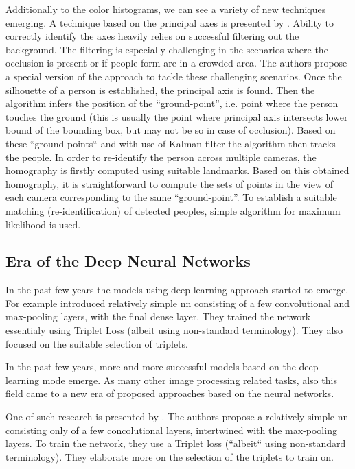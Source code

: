 Additionally to the color histograms, we can see a variety of new techniques emerging. A technique
based on the principal axes is presented by \cite{hu2006principal}. Ability
to correctly identify the axes heavily relies on successful filtering out the
background. The filtering is especially challenging in the scenarios
where the occlusion is present or if people form are in a crowded area. 
The authors propose a special version of the approach to tackle these challenging scenarios.
Once the silhouette of a person is established, the principal axis is found.
Then the algorithm infers the position of the ``ground-point'', i.e. point
where the person touches the ground (this is usually the point where principal
axis intersects lower bound of the bounding box, but may not be so in case
of occlusion). Based on these ``ground-points`` and with use of Kalman filter
the algorithm then tracks the people. In order to re-identify the person
across multiple cameras, the homography is firstly computed using suitable
landmarks. Based on this obtained homography, it is straightforward to 
compute the sets of points in the view of each camera corresponding 
to the same ``ground-point''. To establish a suitable matching (re-identification)
of detected peoples, simple algorithm for maximum likelihood is used.


\subsection{Era of the Deep Neural Networks}

{\color{red}
In the past few years the models using deep learning approach started to
emerge. For example \cite{ding2015deep} introduced relatively simple
\gls{nn} consisting of a few convolutional and max-pooling layers,
with the final dense layer. They trained the network essentialy using
Triplet Loss (albeit using non-standard terminology). They also focused
on the suitable selection of triplets.
}

{\color{blue}
In the past few years, more and more successful models based on the
deep learning mode emerge. As many other image processing related tasks,
also this field came to a new era of proposed approaches based on the 
neural networks.

One of such research is presented by \cite{ding2015deep}. The authors propose
a relatively simple \gls{nn} consisting only of a few concolutional layers, 
intertwined with the max-pooling layers. To train the network, they use a Triplet 
loss (``albeit`` using non-standard terminology). They elaborate more on the
selection of the triplets to train on.
}


